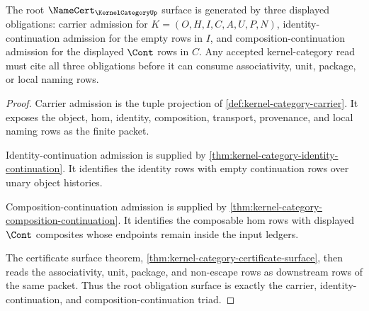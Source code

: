\begin{theorem}
\label{thm:kernel-category-root-namecert-obligation-triad}
The root $\NameCert_{\KernelCategoryUp}$ surface is generated by three displayed obligations: carrier admission for $K=(O,H,I,C,A,U,P,N)$, identity-continuation admission for the empty rows in $I$, and composition-continuation admission for the displayed $\Cont$ rows in $C$. Any accepted kernel-category read must cite all three obligations before it can consume associativity, unit, package, or local naming rows.
\end{theorem}
\begin{proof}
Carrier admission is the tuple projection of \autoref{def:kernel-category-carrier}. It exposes the object, hom, identity, composition, transport, provenance, and local naming rows as the finite packet.

Identity-continuation admission is supplied by \autoref{thm:kernel-category-identity-continuation}. It identifies the identity rows with empty continuation rows over unary object histories.

Composition-continuation admission is supplied by \autoref{thm:kernel-category-composition-continuation}. It identifies the composable hom rows with displayed $\Cont$ composites whose endpoints remain inside the input ledgers.

The certificate surface theorem, \autoref{thm:kernel-category-certificate-surface}, then reads the associativity, unit, package, and non-escape rows as downstream rows of the same packet. Thus the root obligation surface is exactly the carrier, identity-continuation, and composition-continuation triad.
\end{proof}

